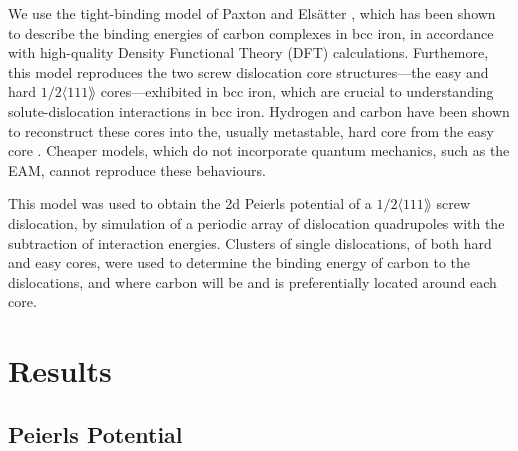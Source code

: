 \documentclass[a4paper,11pt]{article}
\begin{document}
We use the tight-binding model of Paxton and Elsätter \cite{Paxton2013}, which has been
shown to describe the binding energies of carbon complexes in bcc iron, in accordance with
high-quality Density Functional Theory (DFT) calculations. Furthemore, this model reproduces the
two screw dislocation core structures---the easy and hard \(1/2\langle 111 \rang\) cores---exhibited in bcc
iron, which are crucial to understanding solute-dislocation interactions in bcc iron. Hydrogen and
carbon have been shown to reconstruct these cores into the, usually metastable, hard core from
the easy core \cite{Ventelon2015,itakura13_effec_hydrog_atoms_screw_disloc}. Cheaper models, which
do not incorporate quantum mechanics, such as the EAM, cannot reproduce these behaviours.

This model was used to obtain the 2d Peierls potential of a \(1/2\langle 111 \rang\) screw dislocation, by
simulation of a periodic array of dislocation quadrupoles with the subtraction of interaction
energies. Clusters of single dislocations, of both hard and easy cores, were used to determine
the binding energy of carbon to the dislocations, and where carbon will be and is preferentially
located around each core. 



\section{Results}
\label{sec:orge5cb1f9}



\subsection{Peierls Potential}
\label{sec:orgd9c16b2}
\end{document}
